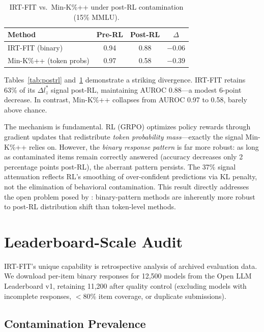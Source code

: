 \documentclass[11pt,a4paper]{article}
\begin{document}
\begin{table}[t]
\centering
\caption{IRT-FIT vs.\ Min-K\%++ under post-RL contamination (15\% MMLU).}
\label{tab:postrl_vs_mia}
\begin{tabular}{lccc}
\toprule
Method & Pre-RL & Post-RL & $\Delta$ \\
\midrule
IRT-FIT (binary) & 0.94 & 0.88 & $-$0.06 \\
Min-K\%++ (token probs) & 0.97 & 0.58 & $-$0.39 \\
\bottomrule
\end{tabular}
\end{table}

Tables~\ref{tab:postrl} and~\ref{tab:postrl_vs_mia} demonstrate a striking divergence.
IRT-FIT retains 63\% of its $\Delta l_{z}^{*}$ signal post-RL, maintaining AUROC 0.88---a modest 6-point decrease.
In contrast, Min-K\%++ collapses from AUROC 0.97 to 0.58, barely above chance.

The mechanism is fundamental.
RL (GRPO) optimizes policy rewards through gradient updates that redistribute \emph{token probability mass}---exactly the signal Min-K\%++ relies on.
However, the \emph{binary response pattern} is far more robust: as long as contaminated items remain correctly answered (accuracy decreases only 2 percentage points post-RL), the aberrant pattern persists.
The 37\% signal attenuation reflects RL's smoothing of over-confident predictions via KL penalty, not the elimination of behavioral contamination.
This result directly addresses the open problem posed by \citet{wang2025contamination}: binary-pattern methods are inherently more robust to post-RL distribution shift than token-level methods.

\section{Leaderboard-Scale Audit}
\label{sec:audit}

IRT-FIT's unique capability is retrospective analysis of archived evaluation data.
We download per-item binary responses for 12,500 models from the Open LLM Leaderboard v1, retaining 11,200 after quality control (excluding models with incomplete responses, $<$80\% item coverage, or duplicate submissions).

\subsection{Contamination Prevalence}
\end{document}
